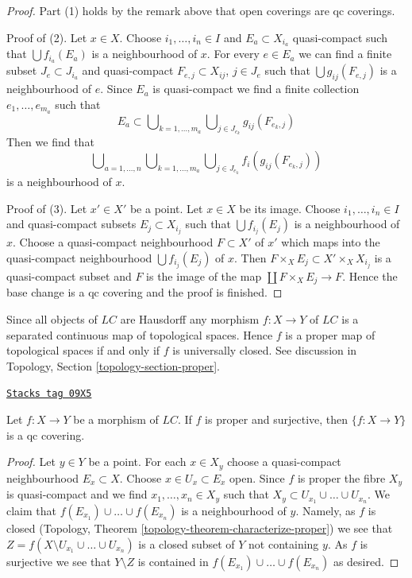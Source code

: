 \begin{proof}
Part (1) holds by the remark above that open coverings are qc coverings.

\medskip\noindent
Proof of (2). Let $x \in X$. Choose $i_1, \ldots, i_n \in I$ and
$E_a \subset X_{i_a}$ quasi-compact such that $\bigcup f_{i_a}(E_a)$
is a neighbourhood of $x$. For every $e \in E_a$ we can find
a finite subset $J_e \subset J_{i_a}$ and quasi-compact
$F_{e, j} \subset X_{ij}$, $j \in J_e$ such that $\bigcup g_{ij}(F_{e, j})$
is a neighbourhood of $e$. Since $E_a$ is quasi-compact we find
a finite collection $e_1, \ldots, e_{m_a}$ such that
$$
E_a \subset
\bigcup\nolimits_{k = 1, \ldots, m_a}
\bigcup\nolimits_{j \in J_{e_k}} g_{ij}(F_{e_k, j})
$$
Then we find that
$$
\bigcup\nolimits_{a = 1, \ldots, n}
\bigcup\nolimits_{k = 1, \ldots, m_a}
\bigcup\nolimits_{j \in J_{e_k}} f_i(g_{ij}(F_{e_k, j}))
$$
is a neighbourhood of $x$.

\medskip\noindent
Proof of (3). Let $x' \in X'$ be a point. Let $x \in X$ be its image.
Choose $i_1, \ldots, i_n \in I$ and quasi-compact subsets
$E_j \subset X_{i_j}$ such that $\bigcup f_{i_j}(E_j)$ is a
neighbourhood of $x$. Choose a quasi-compact neighbourhood $F \subset X'$
of $x'$ which maps into the quasi-compact neighbourhood
$\bigcup f_{i_j}(E_j)$ of $x$. Then
$F \times_X E_j \subset X' \times_X X_{i_j}$ is a
quasi-compact subset and $F$ is the image of the map
$\coprod F \times_X E_j \to F$. Hence the base change is a
qc covering and the proof is finished.
\end{proof}

Since all objects of $\textit{LC}$ are Hausdorff any morphism
$f : X \to Y$ of $\textit{LC}$ is a separated continuous map
of topological spaces. Hence $f$ is a proper map of topological spaces
if and only if $f$ is universally closed. See discussion in
Topology, Section \ref{topology-section-proper}.

\begin{lemma}
\label{sites-cohomology-lemma-proper-surjective-is-qc-covering}
\href{https://stacks.math.columbia.edu/tag/09X5}{\texttt{Stacks tag 09X5}}

Let $f : X \to Y$ be a morphism of $\textit{LC}$.
If $f$ is proper and surjective, then $\{f : X \to Y\}$
is a qc covering.
\end{lemma}

\begin{proof}
Let $y \in Y$ be a point. For each $x \in X_y$ choose a quasi-compact
neighbourhood $E_x \subset X$. Choose $x \in U_x \subset E_x$ open.
Since $f$ is proper the fibre $X_y$ is quasi-compact and we find
$x_1, \ldots, x_n \in X_y$ such that
$X_y \subset U_{x_1} \cup \ldots \cup U_{x_n}$.
We claim that $f(E_{x_1}) \cup \ldots \cup f(E_{x_n})$ is a neighbourhood of
$y$. Namely, as $f$ is closed
(Topology, Theorem \ref{topology-theorem-characterize-proper})
we see that $Z = f(X \setminus U_{x_1} \cup \ldots \cup U_{x_n})$
is a closed subset of $Y$ not containing $y$. As $f$ is surjective
we see that $Y \setminus Z$ is contained in
$f(E_{x_1}) \cup \ldots \cup f(E_{x_n})$ as desired.
\end{proof}

